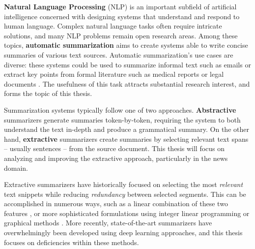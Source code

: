 \textbf{Natural Language Processing} (NLP) is an important subfield of artificial intelligence concerned with designing systems that understand and respond to human language. Complex natural language tasks often require intricate solutions, and many NLP problems remain open research areas.
Among these topics, \textbf{automatic summarization} aims to create systems able to write concise summaries of various text sources.
Automatic summarization's use cases are diverse: these systems could be used to summarize informal text such as emails or extract key points from formal literature such as medical reports or legal documents \parencite{zhang2018radsum, billsum}.
The usefulness of this task attracts substantial research interest, and forms the topic of this thesis.

Summarization systems typically follow one of two approaches. \textbf{Abstractive} summarizers generate summaries token-by-token, requiring the system to both understand the text in-depth and produce a grammatical summary. 
On the other hand, \textbf{extractive} summarizers create summaries by selecting relevant text spans -- usually sentences -- from the source document.
This thesis will focus on analyzing and improving the extractive approach, particularly in the news domain.

Extractive summarizers have historically focused on selecting the most \textit{relevant} text snippets while reducing \textit{redundancy} between selected segments. This can be accomplished in numerous ways, such as a linear combination of these two features \parencite{mmr}, or more sophisticated formulations using integer linear programming or graphical methods \parencite{mcdonald2007study, textrank}.
More recently, state-of-the-art summarizers have overwhelmingly been developed using deep learning approaches, and this thesis focuses on deficiencies within these methods.

